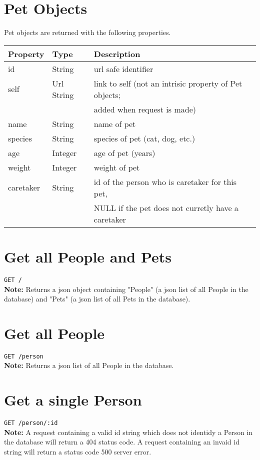 \documentclass{article}
\begin{document}
\section*{Pet Objects}
Pet objects are returned with the following properties. \\
\begin{tabular}{| l | l | l |}
	\hline
	\textbf{Property}     & \textbf{Type}   & \textbf{Description} \\
	\hline
	id                    & String          & url safe identifier \\
	\hline
	self                  & Url String      & link to self (not an intrisic property of Pet objects; \\
	                      &                 & added when request is made) \\
	\hline
	name		      & String          & name of pet \\
	\hline
	species               & String          & species of pet (cat, dog, etc.) \\
	\hline
	age                   & Integer	        & age of pet (years) \\
	\hline
	weight                & Integer         & weight of pet \\
	\hline
	caretaker             & String          & id of the person who is caretaker for this pet, \\
	                      &                 & NULL if the pet does not curretly have a caretaker \\
	\hline
\end{tabular}

\section*{Get all People and Pets}
\texttt{GET /} \\
\textbf{Note:} Returns a json object containing "People" (a json list of all People in the
database) and "Pets" (a json list of all Pets in the database).

\section*{Get all People}
\texttt{GET /person} \\
\textbf{Note:} Returns a json list of all People in the database.

\section*{Get a single Person}
\texttt{GET /person/:id} \\
\textbf{Note:} A request containing a valid id string which does not
identidy a Person in the database will return a 404 status code. A request
containing an invaid id string will return a status code 500 server error.
\end{document}
